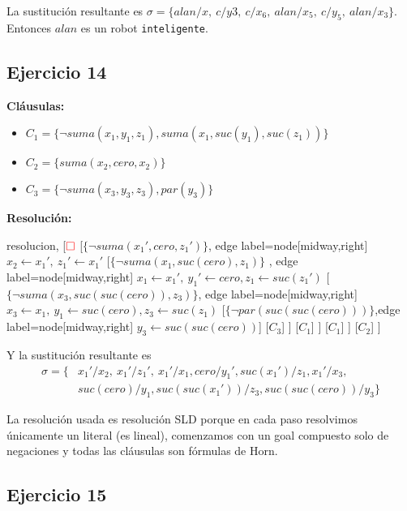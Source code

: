 \documentclass[10pt,a4paper]{article}
\begin{document}
La sustitución resultante es $\sigma = \{ alan/x,~c/y3,~c/x_6,~alan/x_5,~c/y_5,~alan/x_3\}$. Entonces $alan$ es un robot \texttt{inteligente}.

\subsection{Ejercicio 14}
\textbf{Cláusulas:}
\begin{itemize}
\item $C_1 = \{\lnot suma(x_1,y_1,z_1), suma(x_1,suc(y_1),suc(z_1))\}$
\item $C_2 =\{suma(x_2,cero,x_2)\}$
\item $C_3 =\{\lnot suma(x_3,y_3,z_3), par(y_3)\}$
\end{itemize}

\textbf{Resolución:}
\begin{center}
	\begin{forest} resolucion,
[${\color{red}\Box}$ 
        	[$\{\lnot suma(x_1'\comma cero\comma z_1')\}$,
            edge label={node[midway,right] {$x_2\leftarrow x_1',~z_1' \leftarrow x_1'$}}
            	[$\{\lnot suma(x_1\comma suc(cero)\comma z_1)\}$
            	, edge label={node[midway,right] {$x_1\leftarrow x_1',~y_1'\leftarrow cero, z_1 \leftarrow suc(z_1')$}}
                	[$\{\lnot suma(x_3 \comma suc(suc(cero)) \comma z_3)\}$, edge label={node[midway,right] {$x_3\leftarrow x_1,~y_1\leftarrow suc(cero), z_3\leftarrow suc(z_1)$}}
                    	[$\{\lnot par(suc(suc(cero)))\}$,edge label={node[midway,right] {$y_3\leftarrow suc(suc(cero))$}}]
                    	[$C_3$]
                	]
                	[$C_1$]
            	]
            	[$C_1$]
        	]
        	[$C_2$]
]
	\end{forest}
\end{center}

Y la sustitución resultante es 
\begin{align*}
\sigma = \{ &x_1'/x_2,~x_1'/z_1',~x_1'/x_1, cero/y_1', suc(x_1')/z_1, x_1'/x_3, \\ &suc(cero)/y_1, suc(suc(x_1'))/z_3, suc(suc(cero))/y_3\}
\end{align*}

La resolución usada es resolución SLD porque en cada paso resolvimos únicamente un literal (es lineal), comenzamos con un goal compuesto solo de negaciones y todas las cláusulas son fórmulas de Horn.

\subsection{Ejercicio 15}
\end{document}
